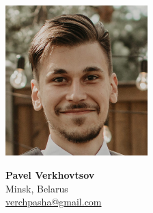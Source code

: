 \documentclass[margin, 10pt]{Stylesheet}
\begin{document}
\noindent\begin{minipage}{0.4\textwidth}%
\hspace*{-1.2cm}\includegraphics[width=5.5cm]{Pavel_Verkhovtsov.jpg}
\end{minipage}%
\hfill%
\begin{minipage}{0.6\textwidth}
{\large\bf Pavel Verkhovtsov}\\
Minsk, Belarus\\
\href{mailto:verchpasha@gmail.com}{verchpasha@gmail.com}\\
\end{minipage}
\end{document}
